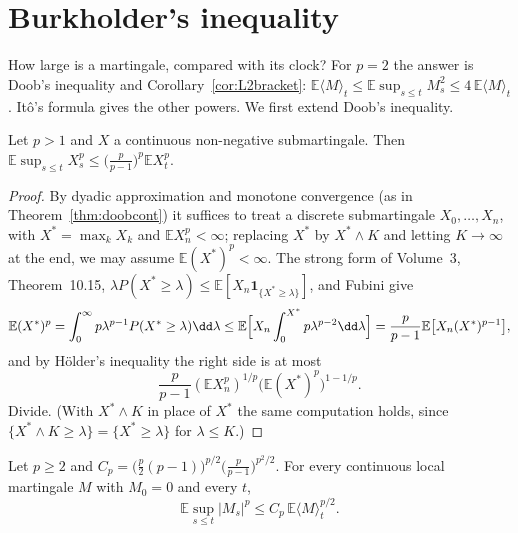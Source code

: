 \section{Burkholder's inequality}

How large is a martingale, compared with its clock? For $p=2$ the answer is Doob's inequality and Corollary~\ref{cor:L2bracket}: $\mathbb E\langle M\rangle_t\le\mathbb E\sup_{s\le t}M_s^2\le4\,\mathbb E\langle M\rangle_t$. It\^o's formula
gives the other powers. We first extend Doob's inequality.

\begin{lemma}\label{lem:doobp}
Let $p>1$ and $X$ a continuous non-negative submartingale. Then $\mathbb E\sup_{s\le t}X_s^p\le\bigl(\frac p{p-1}\bigr)^p\mathbb EX_t^p$.
\end{lemma}

\begin{proof}
By dyadic approximation and monotone convergence (as in Theorem~\ref{thm:doobcont}) it suffices to treat a discrete submartingale $X_0,\dots,X_n$, with $X^*=\max_kX_k$ and $\mathbb EX_n^p<\infty$; replacing $X^*$ by $X^*\wedge K$
and letting $K\to\infty$ at the end, we may assume $\mathbb E(X^*)^p<\infty$. The strong form of Volume~3, Theorem~10.15, $\lambda P(X^*\ge\lambda)\le\mathbb E[X_n\mathbf 1_{\{X^*\ge\lambda\}}]$, and Fubini give
\[
\mathbb E(X^*)^p=\int_0^\infty p\lambda^{p-1}P(X^*\ge\lambda)\dd\lambda\le\mathbb E\Bigl[X_n\int_0^{X^*}p\lambda^{p-2}\dd\lambda\Bigr]=\frac p{p-1}\mathbb E\bigl[X_n(X^*)^{p-1}\bigr],
\]
and by H\"older's inequality the right side is at most
\[
\frac p{p-1}(\mathbb EX_n^p)^{1/p}\bigl(\mathbb E(X^*)^p\bigr)^{1-1/p}.
\]
Divide. (With $X^*\wedge K$ in place of $X^*$ the same computation holds, since
$\{X^*\wedge K\ge\lambda\}=\{X^*\ge\lambda\}$ for $\lambda\le K$.)
\end{proof}

\begin{theorem}[Burkholder, 1966]\label{thm:bdg}
Let $p\ge2$ and $C_p=\bigl(\frac{p}{2}(p-1)\bigr)^{p/2}\bigl(\frac p{p-1}\bigr)^{p^2/2}$. For every continuous local martingale $M$ with $M_0=0$ and every $t$,
\[
\mathbb E\sup_{s\le t}|M_s|^p\le C_p\,\mathbb E\langle M\rangle_t^{p/2}.
\]
\end{theorem}

